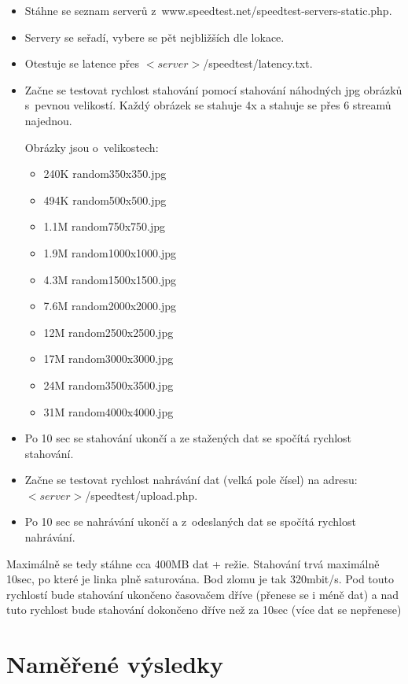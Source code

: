 \documentclass[12pt,a4paper]{article}
\begin{document}
\begin{itemize}
\item Stáhne se seznam serverů z~www.speedtest.net/speedtest-servers-static.php.
\item Servery se seřadí, vybere se pět nejbližších dle lokace.
\item Otestuje se latence přes $<server>$/speedtest/latency.txt.
\item Začne se testovat rychlost stahování pomocí stahování náhodných jpg obrázků s~pevnou velikostí. Každý obrázek se stahuje 4x a stahuje se přes 6 streamů najednou.

Obrázky jsou o~velikostech:


\begin{itemize}
\item 240K random350x350.jpg
\item 494K random500x500.jpg
\item 1.1M random750x750.jpg
\item 1.9M random1000x1000.jpg
\item 4.3M random1500x1500.jpg
\item 7.6M random2000x2000.jpg
\item  12M random2500x2500.jpg
\item  17M random3000x3000.jpg
\item  24M random3500x3500.jpg
\item  31M random4000x4000.jpg
\end{itemize}

\item Po 10 sec se stahování ukončí a ze stažených dat se spočítá rychlost stahování.
\item Začne se testovat rychlost nahrávání dat (velká pole čísel) na adresu: $<server>$/speedtest/upload.php.
\item Po 10 sec se nahrávání ukončí a z~odeslaných dat se spočítá rychlost nahrávání.
\end{itemize}

Maximálně se tedy stáhne cca 400MB dat + režie. Stahování trvá maximálně 10sec, po které je linka plně saturována. Bod zlomu je tak 320mbit/s. Pod touto rychlostí bude stahování ukončeno časovačem dříve (přenese se i méně dat) a nad tuto rychlost bude stahování dokončeno dříve než za 10sec (více dat se nepřenese)


\section{Naměřené výsledky}
\end{document}

